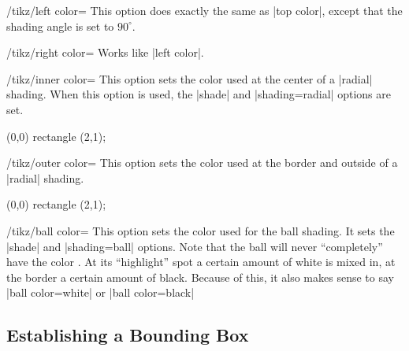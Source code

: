 \begin{key}{/tikz/left color=}
  This option does exactly the same as |top color|, except that the
  shading angle is set to $90^\circ$.
\end{key}

\begin{key}{/tikz/right color=}
  Works like |left color|.
\end{key}

\begin{key}{/tikz/inner color=}
  This option sets the color used at the center of a |radial|
  shading. When this option is used, the |shade| and |shading=radial|
  options are set.
  
\begin{codeexample}[]
\tikz \draw[inner color=red] (0,0) rectangle (2,1);
\end{codeexample}
\end{key}

\begin{key}{/tikz/outer color=}
  This option sets the color used at the border and outside of a
  |radial| shading.
  
\begin{codeexample}[]
\tikz \draw[outer color=red,inner color=white]
  (0,0) rectangle (2,1);
\end{codeexample}
\end{key}


\begin{key}{/tikz/ball color=}
  This option sets the color used for the ball shading. It sets the
  |shade| and |shading=ball| options. Note that the ball will never
  ``completely'' have the color . At its ``highlight'' spot
  a certain amount of white is mixed in, at the border a certain
  amount of black. Because of this, it also makes sense to say
  |ball color=white| or |ball color=black|

\begin{codeexample}[]
\end{codeexample}
\end{key}



\subsection{Establishing a Bounding Box}


